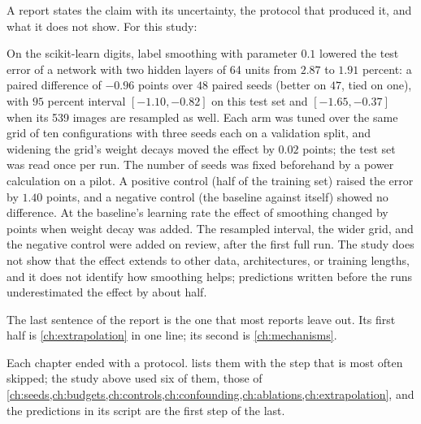 \begin{refsection}

A report states the claim with its uncertainty, the protocol that produced it, and what it does not show. For this study:

\begin{aside}[Report]
On the scikit-learn digits, label smoothing with parameter $0.1$ lowered the test error of a network with two hidden layers of 64 units from $2.87$ to $1.91$ percent: a paired difference of $-0.96$ points over $48$ paired seeds (better on $47$, tied on one), with $95$ percent interval $[-1.10,-0.82]$ on this test set and $[-1.65,-0.37]$ when its 539 images are resampled as well. Each arm was tuned over the same grid of ten configurations with three seeds each on a validation split, and widening the grid's weight decays moved the effect by $0.02$ points; the test set was read once per run. The number of seeds was fixed beforehand by a power calculation on a pilot. A positive control (half of the training set) raised the error by $1.40$ points, and a negative control (the baseline against itself) showed no difference. At the baseline's learning rate the effect of smoothing changed by  points when weight decay was added. The resampled interval, the wider grid, and the negative control were added on review, after the first full run. The study does not show that the effect extends to other data, architectures, or training lengths, and it does not identify how smoothing helps; predictions written before the runs underestimated the effect by about half.
\end{aside}

The last sentence of the report is the one that most reports leave out. Its first half is \cref{ch:extrapolation} in one line; its second is \cref{ch:mechanisms}.


Each chapter ended with a protocol.  lists them with the step that is most often skipped; the study above used six of them, those of \cref{ch:seeds,ch:budgets,ch:controls,ch:confounding,ch:ablations,ch:extrapolation}, and the predictions in its script are the first step of the last.


\end{refsection}
